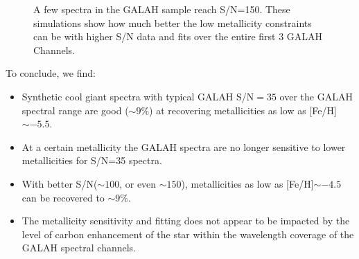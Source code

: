 \documentclass[]{aastex631}
\newcommand{\feh}{[Fe/H]\xspace}
\begin{document}
\begin{figure}



\caption{A few spectra in the GALAH sample reach S/N=150. These simulations show how much better the low metallicity constraints can be with higher S/N data and fits over the entire first 3 GALAH Channels.
}
\label{fig:high_sn_sim}
\end{figure}

To conclude, we find:
\begin{itemize}
    \item Synthetic cool giant spectra with typical GALAH S/N$=35$ over the GALAH spectral range are good ($\sim9\%$) at recovering metallicities as low as \feh $\sim-5.5$. 
    \item At a certain metallicity the GALAH spectra are no longer sensitive to lower metallicities for S/N=35 spectra.
    \item With better S/N($\sim 100$, or even $\sim 150$), metallicities as low as \feh $\sim-4.5$ can be recovered to $\sim9\%$.
    \item The metallicity sensitivity and fitting does not appear to be impacted by the level of carbon enhancement of the star within the wavelength coverage of the GALAH spectral channels.
\end{itemize}
\end{document}
